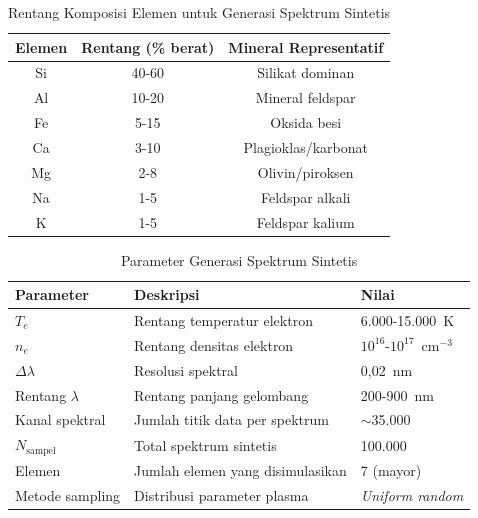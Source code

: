 \begin{table}[htbp]
  \centering
  \caption{Rentang Komposisi Elemen untuk Generasi Spektrum Sintetis}
  \label{tab:komposisi_elemen}
  \small
  \begin{tabular}{|c|c|c|}
    \hline
    \textbf{Elemen} & \textbf{Rentang (\% berat)} & \textbf{Mineral Representatif} \\
    \hline
    Si & 40-60 & Silikat dominan \\
    \hline
    Al & 10-20 & Mineral feldspar \\
    \hline
    Fe & 5-15  & Oksida besi \\
    \hline
    Ca & 3-10  & Plagioklas/karbonat \\
    \hline
    Mg & 2-8   & Olivin/piroksen \\
    \hline
    Na & 1-5   & Feldspar alkali \\
    \hline
    K  & 1-5   & Feldspar kalium \\
    \hline
  \end{tabular}
\end{table}

\begin{table}[htbp]
  \centering
  \caption{Parameter Generasi Spektrum Sintetis}
  \label{tab:param_sintetis}
  \small
  \begin{tabular}{|l|l|l|}
    \hline
    \textbf{Parameter} & \textbf{Deskripsi} & \textbf{Nilai} \\
    \hline
    $T_e$ & Rentang temperatur elektron & 6.000-15.000~K \\
    \hline
    $n_e$ & Rentang densitas elektron & $10^{16}$-$10^{17}$~cm$^{-3}$ \\
    \hline
    $\Delta\lambda$ & Resolusi spektral & 0,02~nm \\
    \hline
    Rentang $\lambda$ & Rentang panjang gelombang & 200-900~nm \\
    \hline
    Kanal spektral & Jumlah titik data per spektrum & $\sim$35.000 \\
    \hline
    $N_{\text{sampel}}$ & Total spektrum sintetis & 100.000 \\
    \hline
    Elemen & Jumlah elemen yang disimulasikan & 7 (mayor) \\
    \hline
    Metode sampling & Distribusi parameter plasma & \textit{Uniform random} \\
    \hline
  \end{tabular}
\end{table}

